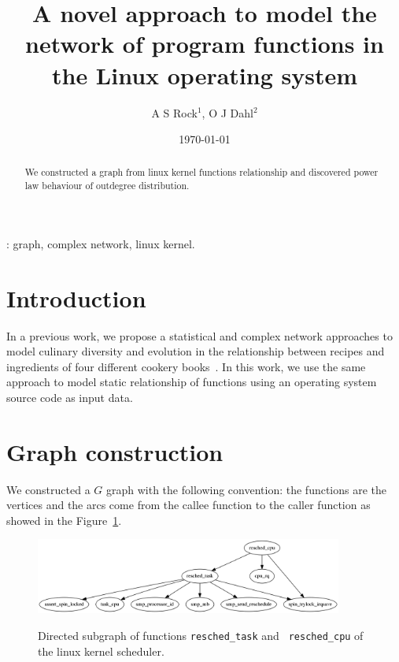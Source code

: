 \documentclass[a4paper, 10pt]{iopart}
\begin{document}
\title[A novel approach to model program functions relationship]{A
  novel approach to model the network of program functions in the
  Linux operating system}

\author{A S Rock$^1$, O J Dahl$^2$}
\address{$^1$ Open Faculty, Azteria}
\address{$^2$ Union University, Teoplia}
\date{\today}

\begin{abstract}
We constructed a graph from linux kernel functions relationship and
discovered power law behaviour of outdegree distribution.
\end{abstract}

: graph, complex network, linux kernel.

\submitto{\NJP}
\maketitle

\section{Introduction}

In a previous work, we propose a statistical and complex network
approaches to model culinary diversity and evolution in the
relationship between recipes and ingredients of four different cookery
books~\cite{culinary:njp:2008}. In this work, we use the same approach
to model static relationship of functions using an operating system
source code as input data.

\section{Graph construction}

We constructed a $G$ graph with the following convention: 
the functions are the vertices and the arcs come from the callee
function to the caller function as showed in the Figure~\ref{fig:fungraph}.

\begin{figure}[ht]
  \includegraphics[width=0.9\textwidth]{img/fungraph.png}
  \label{fig:fungraph}
  \caption{Directed subgraph of functions {\tt resched\_task} and {\tt
      resched\_cpu} of the linux kernel scheduler.}
\end{figure}
\end{document}

